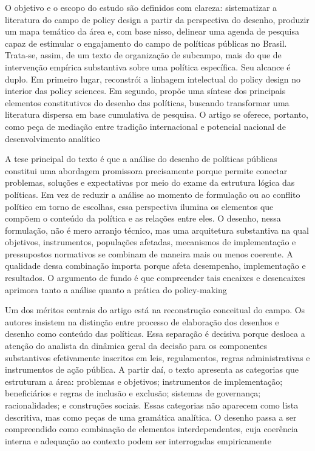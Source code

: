 \documentclass[12pt,a4paper]{article}
\begin{document}
O objetivo e o escopo do estudo são definidos com clareza: sistematizar a literatura do campo de policy design a partir da perspectiva do desenho, produzir um mapa temático da área e, com base nisso, delinear uma agenda de pesquisa capaz de estimular o engajamento do campo de políticas públicas no Brasil. Trata-se, assim, de um texto de organização de subcampo, mais do que de intervenção empírica substantiva sobre uma política específica. Seu alcance é duplo. Em primeiro lugar, reconstrói a linhagem intelectual do policy design no interior das policy sciences. Em segundo, propõe uma síntese dos principais elementos constitutivos do desenho das políticas, buscando transformar uma literatura dispersa em base cumulativa de pesquisa. O artigo se oferece, portanto, como peça de mediação entre tradição internacional e potencial nacional de desenvolvimento analítico \parencite{lima2021_conectando_problemas}

A tese principal do texto é que a análise do desenho de políticas públicas constitui uma abordagem promissora precisamente porque permite conectar problemas, soluções e expectativas por meio do exame da estrutura lógica das políticas. Em vez de reduzir a análise ao momento de formulação ou ao conflito político em torno de escolhas, essa perspectiva ilumina os elementos que compõem o conteúdo da política e as relações entre eles. O desenho, nessa formulação, não é mero arranjo técnico, mas uma arquitetura substantiva na qual objetivos, instrumentos, populações afetadas, mecanismos de implementação e pressupostos normativos se combinam de maneira mais ou menos coerente. A qualidade dessa combinação importa porque afeta desempenho, implementação e resultados. O argumento de fundo é que compreender tais encaixes e desencaixes aprimora tanto a análise quanto a prática do policy-making \parencite{lima2021_conectando_problemas}

Um dos méritos centrais do artigo está na reconstrução conceitual do campo. Os autores insistem na distinção entre processo de elaboração dos desenhos e desenho como conteúdo das políticas. Essa separação é decisiva porque desloca a atenção do analista da dinâmica geral da decisão para os componentes substantivos efetivamente inscritos em leis, regulamentos, regras administrativas e instrumentos de ação pública. A partir daí, o texto apresenta as categorias que estruturam a área: problemas e objetivos; instrumentos de implementação; beneficiários e regras de inclusão e exclusão; sistemas de governança; racionalidades; e construções sociais. Essas categorias não aparecem como lista descritiva, mas como peças de uma gramática analítica. O desenho passa a ser compreendido como combinação de elementos interdependentes, cuja coerência interna e adequação ao contexto podem ser interrogadas empiricamente \parencite{lima2021_conectando_problemas}
\end{document}
